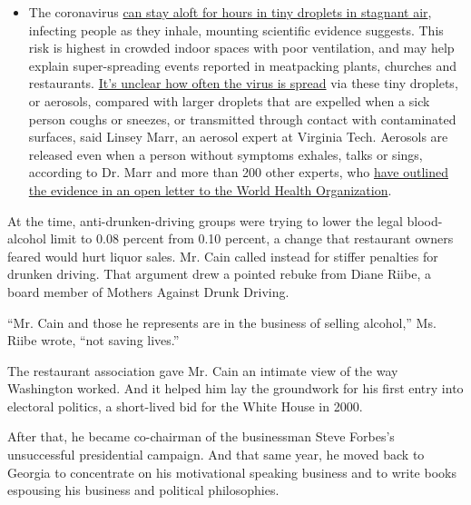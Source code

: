 \begin{itemize}
  \begin{itemize}
  \tightlist
  \item
    The coronavirus
    \href{https://www.nytimes3xbfgragh.onion/2020/07/04/health/239-experts-with-one-big-claim-the-coronavirus-is-airborne.html?action=click\&pgtype=Article\&state=default\&region=MAIN_CONTENT_3\&context=storylines_faq}{can
    stay aloft for hours in tiny droplets in stagnant air}, infecting
    people as they inhale, mounting scientific evidence suggests. This
    risk is highest in crowded indoor spaces with poor ventilation, and
    may help explain super-spreading events reported in meatpacking
    plants, churches and restaurants.
    \href{https://www.nytimes3xbfgragh.onion/2020/07/06/health/coronavirus-airborne-aerosols.html?action=click\&pgtype=Article\&state=default\&region=MAIN_CONTENT_3\&context=storylines_faq}{It's
    unclear how often the virus is spread} via these tiny droplets, or
    aerosols, compared with larger droplets that are expelled when a
    sick person coughs or sneezes, or transmitted through contact with
    contaminated surfaces, said Linsey Marr, an aerosol expert at
    Virginia Tech. Aerosols are released even when a person without
    symptoms exhales, talks or sings, according to Dr. Marr and more
    than 200 other experts, who
    \href{https://academic.oup.com/cid/article/doi/10.1093/cid/ciaa939/5867798}{have
    outlined the evidence in an open letter to the World Health
    Organization}.
  \end{itemize}
\end{itemize}

At the time, anti-drunken-driving groups were trying to lower the legal
blood-alcohol limit to 0.08 percent from 0.10 percent, a change that
restaurant owners feared would hurt liquor sales. Mr. Cain called
instead for stiffer penalties for drunken driving. That argument drew a
pointed rebuke from Diane Riibe, a board member of Mothers Against Drunk
Driving.

``Mr. Cain and those he represents are in the business of selling
alcohol,'' Ms. Riibe wrote, ``not saving lives.''

The restaurant association gave Mr. Cain an intimate view of the way
Washington worked. And it helped him lay the groundwork for his first
entry into electoral politics, a short-lived bid for the White House in
2000.

After that, he became co-chairman of the businessman Steve Forbes's
unsuccessful presidential campaign. And that same year, he moved back to
Georgia to concentrate on his motivational speaking business and to
write books espousing his business and political philosophies.

